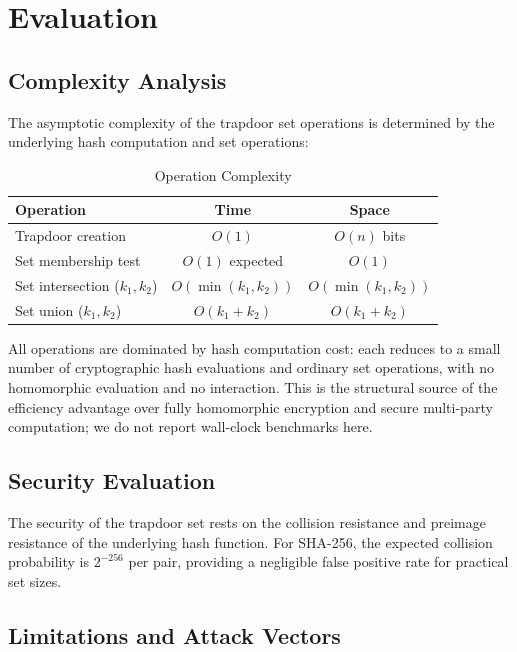 \documentclass[10pt,conference]{IEEEtran}
\begin{document}
\section{Evaluation}
\label{sec:evaluation}

\subsection{Complexity Analysis}

The asymptotic complexity of the trapdoor set operations is determined by the underlying hash computation and set operations:

\begin{table}[h]
\centering
\caption{Operation Complexity}
\label{tab:complexity}
\begin{tabular}{lcc}
\toprule
Operation & Time & Space \\
\midrule
Trapdoor creation & $O(1)$ & $O(n)$ bits \\
Set membership test & $O(1)$ expected & $O(1)$ \\
Set intersection ($k_1, k_2$) & $O(\min(k_1, k_2))$ & $O(\min(k_1, k_2))$ \\
Set union ($k_1, k_2$) & $O(k_1 + k_2)$ & $O(k_1 + k_2)$ \\
\bottomrule
\end{tabular}
\end{table}

All operations are dominated by hash computation cost: each reduces to a small number of cryptographic hash evaluations and ordinary set operations, with no homomorphic evaluation and no interaction. This is the structural source of the efficiency advantage over fully homomorphic encryption and secure multi-party computation; we do not report wall-clock benchmarks here.

\subsection{Security Evaluation}

The security of the trapdoor set rests on the collision resistance and preimage resistance of the underlying hash function. For SHA-256, the expected collision probability is $2^{-256}$ per pair, providing a negligible false positive rate for practical set sizes.

\subsection{Limitations and Attack Vectors}
\end{document}
